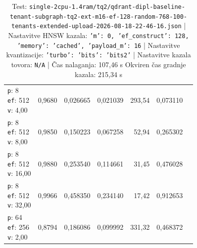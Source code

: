 \begin{table}[htbp]
\begin{tabularx}{\textwidth}{Xrrrrrr}
    \makecell{\texttt{p}: 8\\\texttt{ef}: 512\\\texttt{v}: 4,00} & 0,9680 & 0,026665 & 0,021039 & 293,54 & 0,073110 \\
    \makecell{\texttt{p}: 8\\\texttt{ef}: 512\\\texttt{v}: 8,00} & 0,9850 & 0,150223 & 0,067258 & 52,94 & 0,265302 \\
    \makecell{\texttt{p}: 8\\\texttt{ef}: 512\\\texttt{v}: 16,00} & 0,9880 & 0,253540 & 0,114661 & 31,45 & 0,476028 \\
    \makecell{\texttt{p}: 8\\\texttt{ef}: 512\\\texttt{v}: 32,00} & 0,9966 & 0,458350 & 0,234140 & 17,42 & 0,912653 \\
    \makecell{\texttt{p}: 64\\\texttt{ef}: 256\\\texttt{v}: 2,00} & 0,8794 & 0,186086 & 0,099992 & 331,32 & 0,468372 \\
    \bottomrule
  \end{tabularx}
\caption* {Test: \texttt{single-2cpu-1.4ram/tq2/qdrant-dipl-baseline-tenant-subgraph-tq2-ext-m16-ef-128-random-768-100-tenants-extended-upload-2026-08-18-22-46-16.json} | Nastavitve HNSW kazala: \texttt{{'m': 0, 'ef\_construct': 128, 'memory': 'cached', 'payload\_m': 16}} | Nastavitve kvantizacije: \texttt{{'turbo': {'bits': 'bits2'}}} | Nastavitve kazala tovora: \texttt{N/A} | Čas nalaganja: 107,46 s Okviren čas gradnje kazala: 215,34 s}\end{table}


